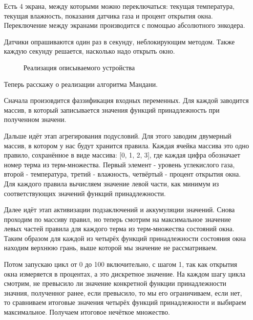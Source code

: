 \documentclass[a4paper]{article}
\begin{document}
Есть 4 экрана, между которыми можно переключаться: текущая температура,
текущая влажность, показания датчика газа и процент открытия окна.
Переключение между экранами производится с помощью абсолютного энкодера.

Датчики опрашиваются один раз в секунду, неблокирующим методом. 
Также каждую секунду решается, насколько надо открыть окно.

\begin{figure}[h]
    \caption{Реализация описываемого устройства} 
\end{figure}

Теперь расскажу о реализации алгоритма Мандани.

Сначала произовдится фаззификация входных переменных.
Для каждой заводится массив, в который записывается значения функций
принадлежность при полученном значени.

Дальше идёт этап агрегирования подусловий. Для этого заводим 
двумерный массив, в котором у нас будут хранится правила. 
Каждая ячейка массива это одно правило, сохранённое в виде массива: 
[0, 1, 2, 3], где каждая цифра обозначает номер терма из терм-множества.
Первый элемент - уровень углекислого газа, второй - температура,
третий - влажность, четвёртый - процент открытия окна.
Для каждого правила вычисляем значение левой части, как минимум из
соответствующих значений функций принадлежности.

Далее идёт этап активизации подзаключений и аккумуляции значений. 
Снова проходим по массиву правил, но теперь смотрим на 
максимальное значение левых частей правила для каждого терма из 
терм-множества состояний окна. Таким образом для каждой из четырёх
функций принадлежности состояния окна находим верхнюю грань, выше 
которой мы значение не рассматриваем.

Потом запускаю цикл от 0 до 100 включительно, с шагом 1, так как
открытия окна измеряется в процентах, а это дискретное
значение. На каждом шагу цикла смотрим, не превысило ли значение
конкретной функции принадлежности значния, полученног ранее, если превысило,
то мы его ограничиваем, если нет, то сравниваем итоговые значения
четырёх функций принадлежности и выбираем максимальное.
Получаем итоговое нечёткое множество.
\end{document}
